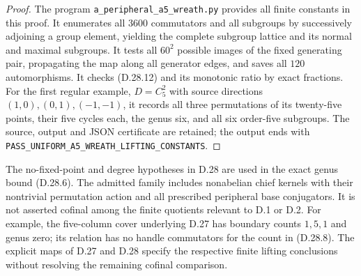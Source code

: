 \begin{proof}
The program \texttt{a\_peripheral\_a5\_wreath.py}
provides all finite constants in this proof.  It
enumerates all $3600$ commutators and all subgroups by
successively adjoining a group element, yielding the
complete subgroup lattice and its normal and maximal
subgroups.  It tests all $60^2$ possible images of the
fixed generating pair, propagating the map along all
generator edges, and saves all $120$ automorphisms.
It checks \textup{(D.28.12)} and its monotonic ratio
by exact fractions.  For the first regular example,
$D=C_5^2$ with source directions $(1,0),(0,1),(-1,-1)$,
it records all three permutations of its twenty-five
points, their five cycles each, the genus six, and
all six order-five subgroups.  The source, output and
JSON certificate are retained; the output ends with
\texttt{PASS\_UNIFORM\_A5\_WREATH\_LIFTING\_CONSTANTS}.
\end{proof}

The no-fixed-point and degree hypotheses in D.28 are
used in the exact genus bound \textup{(D.28.6)}.
The admitted family includes nonabelian chief kernels
with their nontrivial permutation action and all
prescribed peripheral base conjugators.  It is not
asserted cofinal among the finite quotients relevant
to D.1 or D.2.  For example, the five-column cover
underlying D.27 has boundary counts $1,5,1$ and genus
zero; its relation has no handle commutators for the
count in \textup{(D.28.8)}.  The explicit maps of
D.27 and D.28 specify the respective finite lifting
conclusions without resolving the remaining cofinal
comparison.
